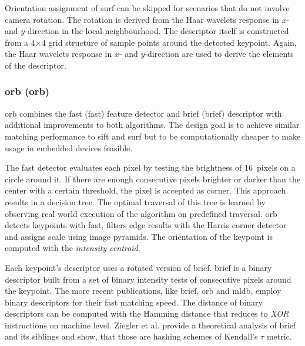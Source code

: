 Orientation assignment of \acrshort{surf} can be skipped for scenarios that do not involve camera rotation.
The rotation is derived from the Haar wavelets\cite{haar_1911} response in $x$- and $y$-direction in the local neighbourhood.
The descriptor itself is constructed from a 4$\times$4 grid structure of sample points around the detected keypoint.
Again, the Haar wavelets response in $x$- and $y$-direction are used to derive the elements of the descriptor.

\subsubsection{\acrshort{orb} (\acrlong{orb})}

\acrshort{orb}\cite{rublee_iccv11} combines the \acrshort{fast}\cite{rosten_eccv06} (\acrlong{fast}) feature detector and \acrshort{brief}\cite{calonder_eccv10} (\acrlong{brief}) descriptor with additional improvements to both algorithms.
The design goal is to achieve similar matching performance to \acrshort{sift} and \acrshort{surf} but to be computationally cheaper to make usage in embedded devices feasible.

The \acrshort{fast} detector evaluates each pixel by testing the brightness of 16~pixels on a circle around it.
If there are enough consecutive pixels brighter or darker than the center with a certain threshold, the pixel is accepted as corner.
This approach results in a decision tree.
The optimal traversal of this tree is learned by observing real world execution of the algorithm on predefined traversal.
\acrshort{orb} detects keypoints with \acrshort{fast}, filters edge results with the Harris corner detector\cite{harris_1988} and assigns scale using image pyramids.
The orientation of the keypoint is computed with the \emph{intensity centroid}\cite{rosin_cviu99}.

Each keypoint's descriptor uses a rotated version of \acrshort{brief}.
\acrshort{brief} is a binary descriptor built from a set of binary intensity tests of consecutive pixels around the keypoint.
The more recent publications, like \acrshort{brief}, \acrshort{orb} and \acrshort{mldb}, employ binary descriptors for their fast matching speed.
The distance of binary descriptors can be computed with the Hamming distance that reduces to \emph{XOR} instructions on machine level.
Ziegler et al.\cite{ziegler_anips2012} provide a theoretical analysis of \acrshort{brief} and its siblings and show, that those are hashing schemes of Kendall's $\tau$ metric\cite{kendall_1938}.


